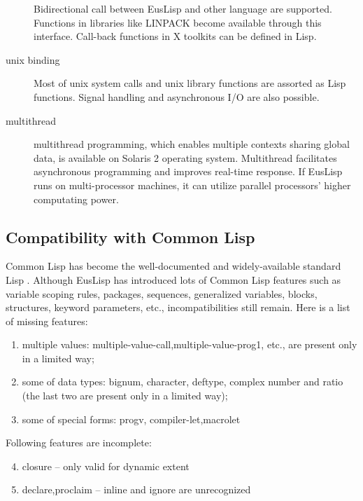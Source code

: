 \begin{description}
Bidirectional call between EusLisp and other language are supported.
Functions in libraries like LINPACK become available through this interface.
Call-back functions in X toolkits can be defined in Lisp.
\item [unix binding]
Most of unix system calls and unix library functions are assorted as Lisp
functions. Signal handling and asynchronous I/O are also possible.
\item [multithread] multithread programming, which enables multiple
contexts sharing global data, is available on Solaris 2 operating system.
Multithread facilitates asynchronous programming and improves real-time
response\cite{MTEus1,MTEus2}.
If EusLisp runs on multi-processor machines, it can utilize 
parallel processors' higher computating power.
\end{description}

\subsection{Compatibility with Common Lisp}

Common Lisp has become the well-documented and widely-available standard Lisp
\cite{CLtL,CLtL2}.
Although EusLisp has introduced lots of Common Lisp features
such as variable scoping rules, packages, sequences, generalized variables,
blocks, structures, keyword parameters, etc.,
incompatibilities still remain.
Here is a list of missing features:

\begin{enumerate}
\item multiple values:
      multiple-value-call,multiple-value-prog1, etc., are present only
      in a limited way;
\item some of data types:
      bignum, character, deftype, complex number and ratio (the last
      two are present only in a limited way);
\item some of special forms:
      progv, compiler-let,macrolet
\end{enumerate}

Following features are incomplete:
\begin{enumerate}
\setcounter{enumi}{3}
\item  closure -- only valid for dynamic extent
\item  declare,proclaim -- inline and ignore are unrecognized
\end{enumerate}

